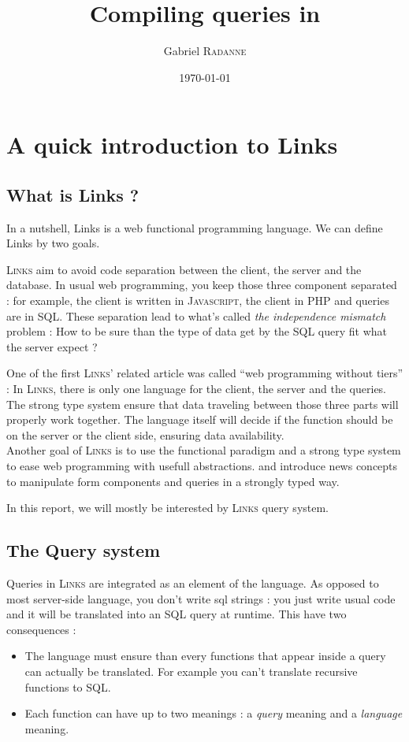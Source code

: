 \documentclass[11pt]{article}
\title{Compiling queries in \links}
\author{Gabriel \textsc{Radanne}}
\date{\today}
\newcommand\mysc[1]{{\rmfamily\textsc{#1}}\xspace}
\newcommand\links{\mysc{Links}}
\newcommand\sql{\mysc{SQL}}
\newcommand\js{\mysc{Javascript}}
\begin{document}
\maketitle
\newpage

\section{A quick introduction to Links}

\subsection{What is Links ?}
In a nutshell, Links is a web functional programming language. We can define Links by two goals.

\links aim to avoid code separation between the client, the server and the database. In usual web programming, you keep those three component separated : for example, the client is written in \js, the client in \mysc{PHP} and queries are in \sql. 
These separation lead to what's called {\it the independence mismatch} problem : How to be sure than the type of data get by the \sql query fit what the server expect ? 

One of the first \links' related article \cite{links:tiers} was called ``web programming without tiers'' : In \links, there is only one language for the client, the server and the queries. 
The strong type system ensure that data traveling between those three parts will properly work together. 
The language itself will decide if the function should be on the server or the client side, ensuring data availability.\\

Another goal of \links is to use the functional paradigm and a strong type system to ease web programming with usefull abstractions. \cite{links:formlets} and \cite{links:effect} introduce news concepts to manipulate form components and queries in a strongly typed way.

In this report, we will mostly be interested by \links query system.

\subsection{The Query system}

Queries in \links are integrated as an element of the language. As opposed to most server-side language, you don't write sql strings : you just write usual code and it will be translated into an \sql query at runtime.
This have two consequences :
\begin{itemize}
\item The language must ensure than every functions that appear inside a query can actually be translated. For example you can't translate recursive functions to \sql.
\item Each function can have up to two meanings : a {\em query} meaning and a {\em language} meaning.
\end{itemize}
\end{document}
